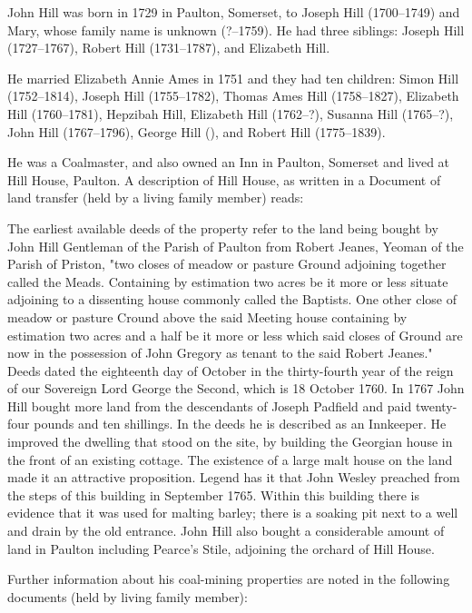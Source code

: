 
John Hill was born in 1729 in Paulton, Somerset, to Joseph Hill (1700--1749) and Mary, whose family name is unknown (?--1759). He had three siblings: Joseph Hill (1727--1767), Robert Hill (1731--1787), and Elizabeth Hill.

He married Elizabeth Annie Ames in 1751 and they had ten children: Simon Hill (1752--1814), Joseph Hill (1755--1782),
Thomas Ames Hill (1758--1827), Elizabeth Hill (1760--1781), Hepzibah Hill, Elizabeth Hill (1762--?), Susanna Hill (1765--?), John Hill (1767--1796), George Hill (), and Robert Hill (1775--1839).

He was a Coalmaster, and also owned an Inn in Paulton, Somerset and lived at Hill House, Paulton. A description of  Hill House, as written in a Document of land transfer (held by a living family member) reads:

The earliest available deeds of the property refer to the land being bought by John Hill Gentleman of the Parish of Paulton from Robert Jeanes, Yeoman of the Parish of Priston, "two closes of meadow or pasture Ground adjoining together called the Meads. Containing by estimation two acres be it more or less situate adjoining to a dissenting house commonly called the Baptists. One other close of meadow or pasture Cround above the said Meeting house containing by estimation two acres and a half be it more or less which said closes of Ground are now in the possession of John Gregory as tenant to the said Robert Jeanes." Deeds dated the eighteenth day of October in the thirty-fourth year of the reign of our Sovereign Lord George the Second, which is 18 October 1760.
In 1767 John Hill bought more land from the descendants of Joseph Padfield and paid twenty-four pounds and ten shillings. In the deeds he is described as an Innkeeper. He improved the dwelling that stood on the site, by building the Georgian house in the front of an existing cottage. The existence of a large malt house on the land made it an attractive proposition. Legend has it that John Wesley preached from the steps of this building in September 1765. Within this building there is evidence that it was used for malting barley; there is a soaking pit next to a well and drain by the old entrance.
John Hill also bought a considerable amount of land in Paulton including Pearce's Stile, adjoining the orchard of Hill House.

Further information about his coal-mining properties are noted in the following documents (held by living family member):

